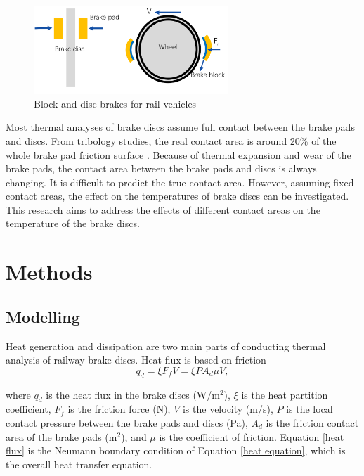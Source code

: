 \begin{figure}[h]
    \centering
    \includegraphics[width=0.65\textwidth]{book/chapters/zhang/graphics/disc_block_brakes.png}
    \caption{Block and disc brakes for rail vehicles}
    \label{fig:disc_block}
\end{figure}

Most thermal analyses of brake discs assume full contact between the brake pads and discs. From tribology studies, the real contact area is around 20\% of the whole brake pad friction surface \cite{eriksson_nature_2002}. Because of thermal expansion and wear of the brake pads, the contact area between the brake pads and discs is always changing. It is difficult to predict the true contact area. However, assuming fixed contact areas, the effect on the temperatures of brake discs can be investigated. This research aims to address the effects of different contact areas on the temperature of the brake discs.



\section*{Methods}

\subsection*{Modelling}
Heat generation and dissipation are two main parts of conducting thermal analysis of railway brake discs. Heat flux is based on friction
\begin{equation}
    q_d = \xi F_f V = \xi P A_d \mu V, 
    \label{heat flux}
\end{equation}

where \( q_d \) is the heat flux in the brake discs (W/m$^2$), \( \xi \) is the heat partition coefficient, \( F_f \) is the friction force (N), \( V \) is the velocity (m/s), \( P \) is the local contact pressure between the brake pads and discs (Pa), \( A_d \) is the friction contact area of the brake pads (m$^2$), and \( \mu \) is the coefficient of friction. Equation \ref{heat flux} is the Neumann boundary condition of Equation \ref{heat equation}, which is the overall heat transfer equation.

